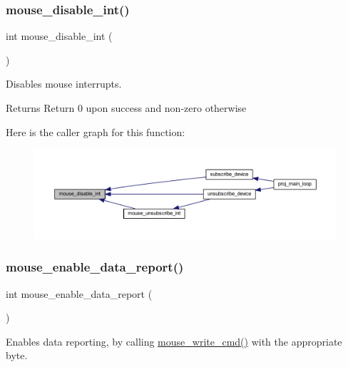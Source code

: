 \subsubsection{\texorpdfstring{mouse\+\_\+disable\+\_\+int()}{mouse\_disable\_int()}}
{\footnotesize\ttfamily int mouse\+\_\+disable\+\_\+int (\begin{DoxyParamCaption}{ }\end{DoxyParamCaption})}



Disables mouse interrupts. 

\begin{DoxyReturn}{Returns}
Return 0 upon success and non-\/zero otherwise 
\end{DoxyReturn}
Here is the caller graph for this function\+:\nopagebreak
\begin{figure}[H]
\begin{center}
\leavevmode
\includegraphics[width=350pt]{group__mouse_ga9b5d5366f7067f50586c03e9a3f000cd_icgraph}
\end{center}
\end{figure}
\mbox{\label{group__mouse_ga108813d01ba189cc8bb0dca728c932a8}} 
\subsubsection{\texorpdfstring{mouse\+\_\+enable\+\_\+data\+\_\+report()}{mouse\_enable\_data\_report()}}
{\footnotesize\ttfamily int mouse\+\_\+enable\+\_\+data\+\_\+report (\begin{DoxyParamCaption}{ }\end{DoxyParamCaption})}



Enables data reporting, by calling \mbox{\hyperlink{group__mouse_ga14261d6dca45cb7cc9c8a786739ac5a3}{mouse\+\_\+write\+\_\+cmd()}} with the appropriate byte. 

